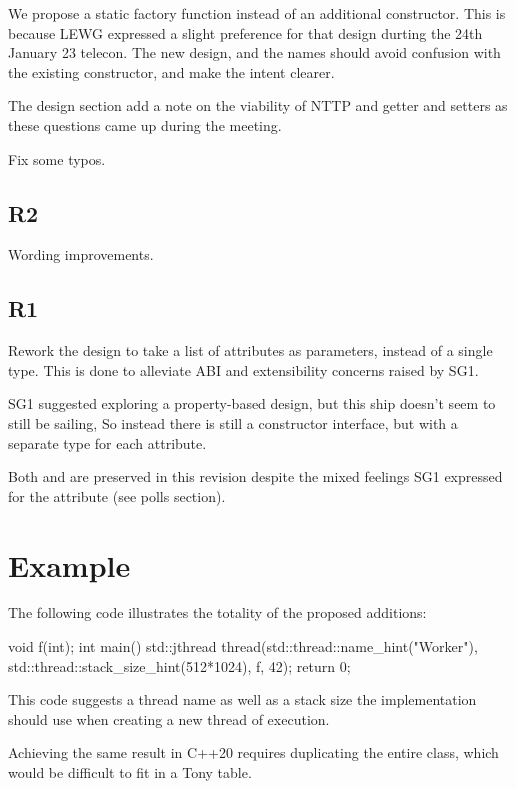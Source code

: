 \documentclass{wg21}
\begin{document}
We propose a  static factory function
instead of an additional constructor.
This is because LEWG expressed a slight preference for that design durting the 24th January 23 telecon.
The new design, and the names should avoid confusion with the existing constructor, and make the intent clearer.

The design section add a note on the viability of NTTP and getter and setters as these questions came up during the meeting.

Fix some typos.

\subsection{R2}

Wording improvements.

\subsection{R1}

Rework the design to take a list of attributes as parameters, instead of a single type.
This is done to alleviate ABI and extensibility concerns raised by SG1.

SG1 suggested exploring a property-based design, but this ship doesn't seem to still be sailing,
So instead there is still a constructor interface, but with a separate type for each attribute.

Both  and  are preserved in this revision despite the
mixed feelings SG1 expressed for the  attribute (see polls section).

\section{Example}

The following code illustrates the totality of the proposed additions:

\begin{colorblock}
void f(int);
int main() {
    std::jthread thread(std::thread::name_hint("Worker"), std::thread::stack_size_hint(512*1024), f, 42);
    return 0;
}
\end{colorblock}


This code suggests a thread name as well as a stack size
the implementation should use when creating a new thread of execution.

Achieving the same result in C++20 requires duplicating the entire 
class, which would be difficult to fit in a Tony table.
\end{document}
